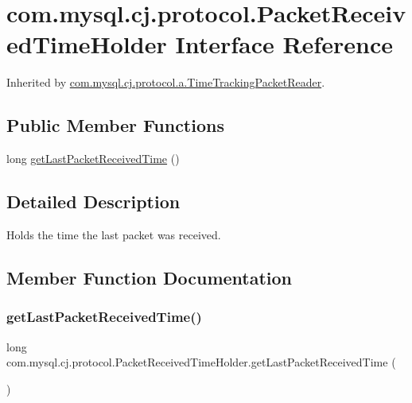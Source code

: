 \hypertarget{interfacecom_1_1mysql_1_1cj_1_1protocol_1_1_packet_received_time_holder}{}\section{com.\+mysql.\+cj.\+protocol.\+Packet\+Received\+Time\+Holder Interface Reference}
\label{interfacecom_1_1mysql_1_1cj_1_1protocol_1_1_packet_received_time_holder}


Inherited by \mbox{\hyperlink{classcom_1_1mysql_1_1cj_1_1protocol_1_1a_1_1_time_tracking_packet_reader}{com.\+mysql.\+cj.\+protocol.\+a.\+Time\+Tracking\+Packet\+Reader}}.

\subsection*{Public Member Functions}
\begin{DoxyCompactItemize}
\item 
long \mbox{\hyperlink{interfacecom_1_1mysql_1_1cj_1_1protocol_1_1_packet_received_time_holder_ae2740ec8278f582c35b94df0028953be}{get\+Last\+Packet\+Received\+Time}} ()
\end{DoxyCompactItemize}


\subsection{Detailed Description}
Holds the time the last packet was received. 

\subsection{Member Function Documentation}
\mbox{\label{interfacecom_1_1mysql_1_1cj_1_1protocol_1_1_packet_received_time_holder_ae2740ec8278f582c35b94df0028953be}} 
\subsubsection{\texorpdfstring{get\+Last\+Packet\+Received\+Time()}{getLastPacketReceivedTime()}}
{\footnotesize\ttfamily long com.\+mysql.\+cj.\+protocol.\+Packet\+Received\+Time\+Holder.\+get\+Last\+Packet\+Received\+Time (\begin{DoxyParamCaption}{ }\end{DoxyParamCaption})}



